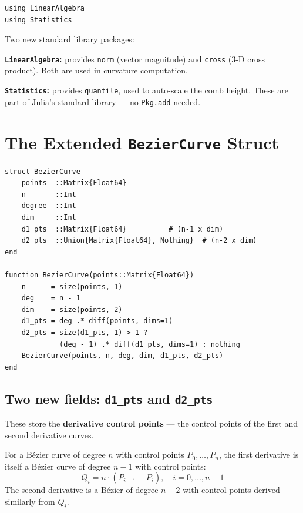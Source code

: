 \documentclass[12pt, a4paper]{article}
\newcommand{\cd}[1]{\texttt{#1}}
\begin{document}
\begin{verbatim}
using LinearAlgebra
using Statistics
\end{verbatim}

Two new standard library packages:

\textbf{\cd{LinearAlgebra}:} provides \cd{norm} (vector
magnitude) and \cd{cross} (3-D cross product).
Both are used in curvature computation.

\textbf{\cd{Statistics}:} provides \cd{quantile},
used to auto-scale the comb height.
These are part of Julia's standard library ---
no \cd{Pkg.add} needed.


\section{The Extended \texttt{BezierCurve} Struct}

\begin{verbatim}
struct BezierCurve
    points  ::Matrix{Float64}
    n       ::Int
    degree  ::Int
    dim     ::Int
    d1_pts  ::Matrix{Float64}          # (n-1 x dim)
    d2_pts  ::Union{Matrix{Float64}, Nothing}  # (n-2 x dim)
end

function BezierCurve(points::Matrix{Float64})
    n      = size(points, 1)
    deg    = n - 1
    dim    = size(points, 2)
    d1_pts = deg .* diff(points, dims=1)
    d2_pts = size(d1_pts, 1) > 1 ?
             (deg - 1) .* diff(d1_pts, dims=1) : nothing
    BezierCurve(points, n, deg, dim, d1_pts, d2_pts)
end
\end{verbatim}

\subsection{Two new fields: \texttt{d1\_pts} and \texttt{d2\_pts}}

These store the \textbf{derivative control points} ---
the control points of the first and second derivative
curves.

For a B\'ezier curve of degree $n$ with control points
$P_0, \ldots, P_n$, the first derivative is itself a
B\'ezier curve of degree $n-1$ with control points:
\[
  Q_i = n \cdot (P_{i+1} - P_i), \quad i = 0, \ldots, n-1
\]
The second derivative is a B\'ezier of degree $n-2$
with control points derived similarly from $Q_i$.
\end{document}
